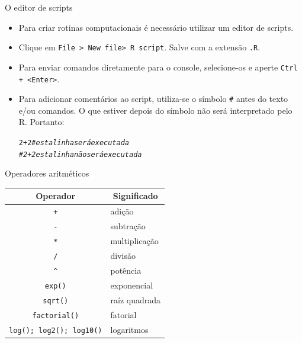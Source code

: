 \documentclass[10pt,handout]{beamer}\usepackage[]{graphicx}\usepackage[]{color}
\makeatletter
\newcommand{\hlnum}[1]{\textcolor[rgb]{0.686,0.059,0.569}{#1}}%
\newcommand{\hlcom}[1]{\textcolor[rgb]{0.498,0.498,0.498}{\textit{#1}}}%
\newcommand{\hlopt}[1]{\textcolor[rgb]{0,0,0}{#1}}%
\newenvironment{kframe}{%
 \def\at@end@of@kframe{}%
 \ifinner\ifhmode%
  \def\at@end@of@kframe{\end{minipage}}%
  \begin{minipage}{\columnwidth}%
 \fi\fi%
 \def\FrameCommand##1{\hskip\@totalleftmargin \hskip-\fboxsep
 \colorbox{shadecolor}{##1}\hskip-\fboxsep
     \hskip-\linewidth \hskip-\@totalleftmargin \hskip\columnwidth}%
 \MakeFramed {\advance\hsize-\width
   \@totalleftmargin\z@ \linewidth\hsize
   \@setminipage}}%
 {\par\unskip\endMakeFramed%
 \at@end@of@kframe}
\newenvironment{knitrout}{}{} %
\makeatother
\begin{document}
\begin{frame}[fragile]{O editor de scripts}
  \begin{itemize}
  \item Para criar rotinas computacionais é necessário utilizar um editor
    de scripts.
  \item Clique em \texttt{File > New file> R script}. Salve com a extensão
    \texttt{.R}.
  \item Para enviar comandos diretamente para o console, selecione-os e
    aperte \texttt{Ctrl + <Enter>}.
  \item Para adicionar comentários ao script, utiliza-se o símbolo
    \texttt{\#} antes do texto e/ou comandos. O que estiver depois do
    símbolo não será interpretado pelo R. Portanto:
\begin{knitrout}\small
{}\color{fgcolor}\begin{kframe}
\begin{alltt}
\hlnum{2} \hlopt{+} \hlnum{2}     \hlcom{# esta linha será executada}
\hlcom{# 2 + 2     esta linha não será executada}
\end{alltt}
\end{kframe}
\end{knitrout}

\end{itemize}
\end{frame}


\begin{frame}[fragile]{Operadores aritméticos}
\begin{table}[!ht]
    \centering
        \begin{tabular}{cl}
        \hline
        \multicolumn{0}{c}{Operador} & \multicolumn{1}{c}{Significado} \\
        \hline
        \verb|+| & adição \\
        \verb|-| & subtração \\
        \verb|*| & multiplicação \\
        \verb|/| & divisão \\
        \verb|^| & potência \\
        \verb|exp()| & exponencial \\
        \verb|sqrt()| & raíz quadrada \\
        \verb|factorial()| & fatorial \\
        \verb|log(); log2(); log10()| & logaritmos \\
        \hline
        \end{tabular}
\end{table}
\end{frame}
\end{document}
